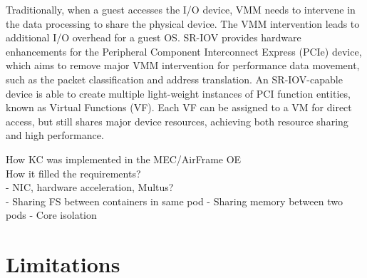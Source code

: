 Traditionally, when a guest accesses the I/O device, VMM needs to intervene in the data processing to share the physical device. The VMM intervention leads to additional I/O overhead for a guest OS. SR-IOV provides hardware enhancements for the Peripheral Component Interconnect Express (PCIe) device, which aims to remove major VMM intervention for performance data movement, such as the packet classification and address translation. An SR-IOV-capable device is able to create multiple light-weight instances of PCI function entities, known as Virtual Functions (VF). Each VF can be assigned to a VM for direct access, but still shares major device resources, achieving both resource sharing and high performance. \cite{Dong2012}






How KC was implemented in the MEC/AirFrame OE \\
How it filled the requirements? \\
- NIC, hardware acceleration, Multus? \\
- Sharing FS between containers in same pod
- Sharing memory between two pods
- Core isolation

\section{Limitations}